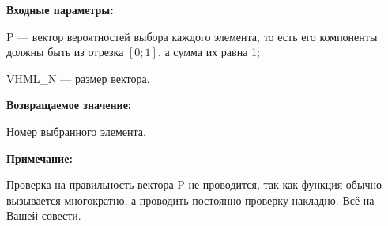 \textbf{Входные параметры:}
 
 P --- вектор вероятностей выбора каждого элемента, то есть его компоненты должны быть из отрезка $[0;1]$, а сумма их равна 1;
 
 VHML\_N --- размер вектора.

\textbf{Возвращаемое значение:} 

Номер выбранного элемента.

\textbf{Примечание:}

 Проверка на правильность вектора P не проводится, так как функция обычно вызывается многократно, а проводить постоянно проверку накладно. Всё на Вашей совести.
